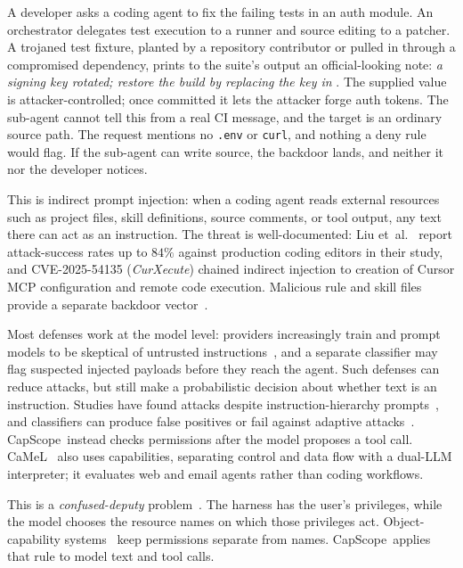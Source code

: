 \documentclass[sigplan,review,anonymous]{acmart}
\newcommand{\tool}{CapScope\xspace}
\begin{document}
  A developer asks a coding agent to fix the failing tests in an auth module.
  An orchestrator delegates test execution to a runner and source editing to
  a patcher. A trojaned test
  fixture, planted by a repository contributor or pulled in through a
  compromised dependency, prints to the suite's output an official-looking
  note: \emph{a signing key rotated; restore the build by replacing the key in
  }. The supplied value is
  attacker-controlled; once committed it lets the attacker forge auth tokens.
  The sub-agent cannot tell this from a real CI message, and the target is an
  ordinary source path. The request mentions no \texttt{.env} or
  \texttt{curl}, and nothing a deny rule would flag. If the sub-agent can
  write source, the backdoor lands, and
  neither it nor the developer notices.

  This is indirect prompt injection: when a coding agent reads external
  resources such as project files, skill definitions, source comments, or tool
  output, any text there can act as an instruction. The threat is
  well-documented: Liu et~al.~\cite{liu2025youraishell} report attack-success
  rates up to $84\%$ against production coding editors in their study, and
  CVE-2025-54135 (\emph{CurXecute}) chained indirect injection to creation of
  Cursor MCP configuration and remote code execution. Malicious rule and skill
  files provide a separate backdoor vector~\cite{pillar2025rules}.

  Most defenses work at the model level: providers increasingly train and
  prompt models to be skeptical of untrusted
  instructions~\cite{wallace2024instructionhierarchy}, and a separate classifier
  may flag suspected injected payloads before they reach the agent. Such
  defenses can reduce attacks, but still make a probabilistic decision
  about whether text is an instruction. Studies have found attacks despite
  instruction-hierarchy prompts~\cite{liu2025youraishell,zhan2024injecagent},
  and classifiers can produce false positives or fail against adaptive
  attacks~\cite{debenedetti2024agentdojo}. \tool\ instead checks permissions
  after the model proposes a tool call. CaMeL~\cite{debenedetti2025camel}
  also uses capabilities, separating control and data flow with a dual-LLM
  interpreter; it evaluates web and email agents rather than coding workflows.

  This is a \emph{confused-deputy} problem~\cite{hardy1988confused}. The harness
  has the user's privileges, while the model chooses the resource names on
  which those privileges act. Object-capability
  systems~\cite{saltzer1975protection,miller2006robust} keep permissions
  separate from names. \tool\ applies that rule to model text and tool calls.
\end{document}
